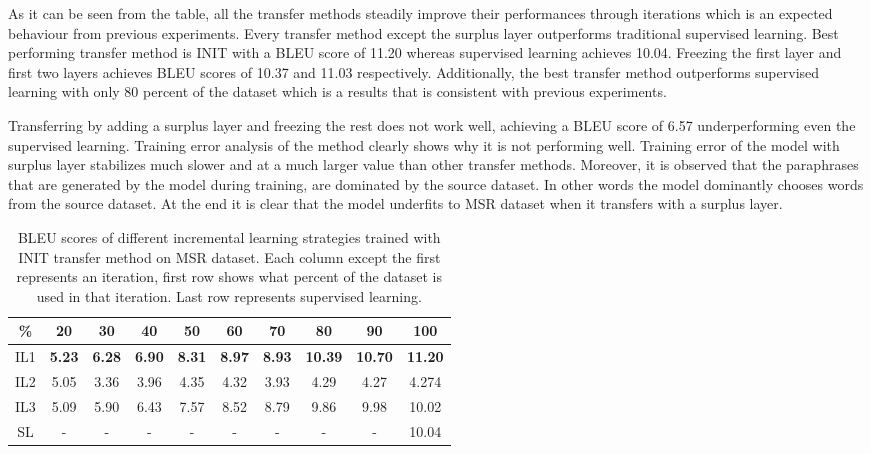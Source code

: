 As it can be seen from the table, all the transfer methods steadily improve their performances through iterations which is an expected behaviour from previous experiments. Every transfer method except the surplus layer outperforms traditional supervised learning. Best performing transfer method is INIT with a BLEU score of 11.20 whereas supervised learning achieves 10.04. Freezing the first layer and first two layers achieves BLEU scores of 10.37 and 11.03 respectively. Additionally, the best transfer method outperforms supervised learning with only 80 percent of the dataset which is a results that is consistent with previous experiments.

Transferring by adding a surplus layer and freezing the rest does not work well, achieving a BLEU score of 6.57 underperforming even the supervised learning. Training error analysis of the method clearly shows why it is not performing well. Training error of the model with surplus layer stabilizes much slower and at a much larger value than other transfer methods. Moreover, it is observed that the paraphrases that are generated by the model during training, are dominated by the source dataset. In other words the model dominantly chooses words from the source dataset. At the end it is clear that the model underfits to MSR dataset when it transfers with a surplus layer.

\begin{table}[t]
\centering
\large
 \begin{tabular}{|c | c | c | c | c | c | c | c | c | c |} 
 \hline
 \% & 20 & 30 & 40 & 50 & 60 & 70 & 80 & 90 & 100 \\ [0.5ex] 
 \hline
  IL1 & \textbf{5.23} & \textbf{6.28} & \textbf{6.90} & \textbf{8.31} & \textbf{8.97} & \textbf{8.93} & \textbf{10.39} & \textbf{10.70} & \textbf{11.20}  \\ 
 \hline
  IL2 & 5.05 & 3.36 & 3.96 & 4.35 & 4.32 & 3.93 & 4.29 & 4.27 & 4.274 \\ 
 \hline
  IL3 & 5.09 & 5.90 & 6.43 & 7.57 & 8.52 & 8.79 & 9.86 & 9.98 & 10.02 \\ 
  \hline
  SL & - & - & - & - & - & - & - & - & 10.04 \\ 
 \hline
\end{tabular}
\caption{BLEU scores of different incremental learning strategies trained with INIT transfer method on MSR dataset. Each column except the first represents an iteration, first row shows what percent of the dataset is used in that iteration. Last row represents supervised learning.}
\end{table}

